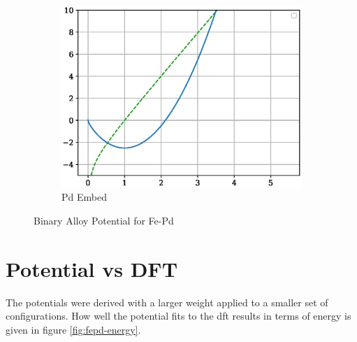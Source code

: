 \begin{figure}[htb]
\begin{subfigure}{.32\textwidth}
  \includegraphics[width=.94\linewidth]{chapters/potentials_fe_pd_ru/fepd_potential/function_plots/pd_embe.eps}  
  \caption{Pd Embed}
  \label{fig:fepd-pd-embe}
\end{subfigure}
\caption{Binary Alloy Potential for Fe-Pd}
\label{fig:fepd-fcc-function-plots}
\end{figure}









\clearpage
\section{Potential vs DFT}

The potentials were derived with a larger weight applied to a smaller set of configurations.  How well the potential fits to the \acrshort{dft} results in terms of energy is given in figure \ref{fig:fepd-energy}.

